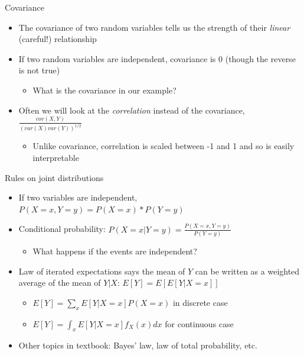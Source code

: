 \documentclass[aspectratio=169]{beamer}
\begin{document}
\begin{frame}{Covariance}
    \begin{itemize}
        \item The covariance of two random variables tells us the strength of their \textit{linear} (careful!) relationship
        \item If two random variables are independent, covariance is 0 (though the reverse is not true)
        \begin{itemize}
            \item What is the covariance in our example?
        \end{itemize}
        \item Often we will look at the \textit{correlation} instead of the covariance, $\frac{cov(X,Y)}{(var(X)var(Y))^{1/2}}$
        \begin{itemize}
            \item Unlike covariance, correlation is scaled between -1 and 1 and so is easily interpretable
        \end{itemize}
    \end{itemize}
\end{frame}

\begin{frame}{Rules on joint distributions}
        \begin{itemize}
            \item If two variables are independent, $P(X=x,Y=y) = P(X=x)*P(Y=y)$
            \item Conditional probability: $P(X=x|Y=y) = \frac{P(X=x,Y=y)}{P(Y=y)}$
            \begin{itemize}
                \item What happens if the events are independent?
            \end{itemize}
            \item Law of iterated expectations says the mean of $Y$ can be written as a weighted average of the mean of $Y|X$: $E[Y] = E[E[Y|X=x]]$
            \begin{itemize}
                \item $E[Y] = \sum_x E[Y|X=x]P(X=x)$ in discrete case
                \item $E[Y] = \int_x E[Y|X=x]f_X(x)dx$ for continuous case
            \end{itemize}
            \item Other topics in textbook: Bayes' law, law of total probability, etc.
        \end{itemize}
\end{frame}
\end{document}
